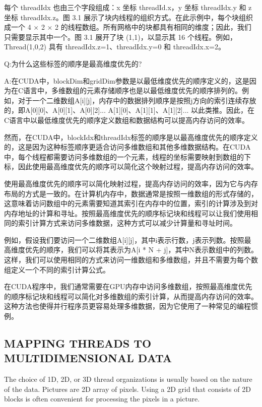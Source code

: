 \documentclass[11pt]{ctexart}
\begin{document}
每个 threadIdx 也由三个字段组成：x 坐标 threadId.x，y 坐标 threadIdx.y 和 z 坐标 threadIdx.z。图 3.1 展示了块内线程的组织方式。在此示例中，每个块组织成一个 4 × 2 × 2 的线程数组。所有网格中的块都具有相同的维度；因此，我们只需要显示其中一个。图 3.1 展开了块 (1,1)，以显示其 16 个线程。例如，Thread(1,0,2) 具有 threadIdx.z=1、threadIdx.y=0 和 threadIdx.x=2。

Q:为什么这些标签的顺序是最高维度优先的?

A:在CUDA中，blockDim和gridDim参数是以最低维度优先的顺序定义的，这是因为在C语言中，多维数组的元素存储顺序也是以最低维度优先的顺序排列的。例如，对于一个二维数组A[i][j]，内存中的数据排列顺序是按照j方向的索引连续存放的，即A[0][0]、A[0][1]、A[0][2]... A[1][0]、A[1][1]、A[1][2]... 以此类推。因此，在C语言中以最低维度优先的顺序定义数组和数据结构可以提高内存访问的效率。

然而，在CUDA中，blockIdx和threadIdx标签的顺序是以最高维度优先的顺序定义的，这是因为这种标签顺序更适合访问多维数组和其他多维数据结构。在CUDA中，每个线程都需要访问多维数组的一个元素，线程的坐标需要映射到数组的下标，因此使用最高维度优先的顺序可以简化这个映射过程，提高内存访问的效率。

使用最高维度优先的顺序可以简化映射过程，提高内存访问的效率，因为它与内存布局的方式是一致的。在计算机内存中，数据通常是按照一维数组的形式存储的，这意味着访问数组中的元素需要知道其索引在内存中的位置，索引的计算涉及到对内存地址的计算和寻址。按照最高维度优先的顺序标记块和线程可以让我们使用相同的索引计算方式来访问多维数据，这种方式可以减少计算量和寻址时间。

例如，假设我们要访问一个二维数组A[i][j]，其中i表示行数，j表示列数。按照最高维度优先的顺序，我们可以将其表示为A[i * N + j]，其中N表示数组中的列数。这样，我们可以使用相同的方式来访问一维数组和多维数组，并且不需要为每个数组定义一个不同的索引计算公式。

在CUDA程序中，我们通常需要在GPU内存中访问多维数组，按照最高维度优先的顺序标记块和线程可以简化对多维数组的索引计算，从而提高内存访问的效率。这种方法也使得并行程序员更容易处理多维数据，因为它使用了一种常见的编程惯例。

\subsection{MAPPING THREADS TO MULTIDIMENSIONAL DATA}

The choice of 1D, 2D, or 3D thread organizations is usually based on the nature of
the data. Pictures are 2D array of pixels. Using a 2D grid that consists of 2D blocks is
often convenient for processing the pixels in a picture.
\end{document}
